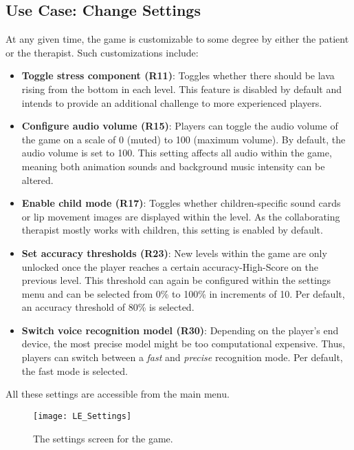 \documentclass[draft,final]{vutinfth} %
\begin{document}
\subsection{Use Case: Change Settings}
At any given time, the game is customizable to some degree by either the patient or the therapist. Such customizations include:
\begin{itemize}
\item \textbf{Toggle stress component (R11)}: Toggles whether there should be lava rising from the bottom in each level. This feature is disabled by default and intends to provide an additional challenge to more experienced players.

\item \textbf{Configure audio volume (R15)}: Players can toggle the audio volume of the game on a scale of 0 (muted) to 100 (maximum volume). By default, the audio volume is set to 100. This setting affects all audio within the game, meaning both animation sounds and background music intensity can be altered.

\item \textbf{Enable child mode (R17)}: Toggles whether children-specific sound cards or lip movement images are displayed within the level. As the collaborating therapist mostly works with children, this setting is enabled by default.

\item \textbf{Set accuracy thresholds (R23)}: New levels within the game are only unlocked once the player reaches a certain accuracy-High-Score on the previous level. This threshold can again be configured within the settings menu and can be selected from 0\% to 100\% in increments of 10. Per default, an accuracy threshold of 80\% is selected.

\item \textbf{Switch voice recognition model (R30)}: Depending on the player's end device, the most precise model might be too computational expensive. Thus, players can  switch between a \emph{fast} and \emph{precise} recognition mode. Per default, the fast mode is selected.
\end{itemize}
All these settings are accessible from the main menu.

\begin{figure}
\begin{center}
\texttt{[image: LE\_Settings]}
\end{center}
\caption{The settings screen for the game.}
\end{figure}
\end{document}
